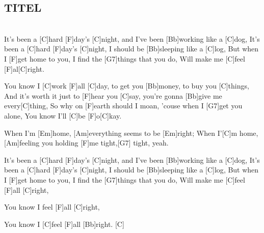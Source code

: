 \subsection{TITEL}

\begin{guitar}
\\
It's been a [C]{hard} [F]{day's} [C]{night}, and I've been [Bb]{work}ing like a [C]{dog},
It's been a [C]{hard} [F]{day's} [C]{night}, I should be [Bb]{sleep}ing like a [C]{log},
But when I [F]{get} home to you, I find the [G7]{things} that you do, 
Will make me [C]{feel} [F]{al}[C]{right}.


You know I [C]{work} [F]{all} [C]{day}, to get you [Bb]{mon}ey, to buy you [C]{things},
And it's worth it just to [F]{hear} you [C]{say}, you're gonna [Bb]{give} me every[C]{thing},
So why on [F]{earth} should I moan, 'couse when I [G7]{get} you alone, 
You know I'll [C]{be} [F]{o}[C]{kay}.


When I'm [Em]{home},  [Am]everything seems to be [Em]{right};
When I'[C]{m} home, [Am]feeling you holding [F]{me} tight,[G7]{ }tight, yeah.


It's been a [C]{hard} [F]{day's} [C]{night}, and I've been [Bb]{work}ing like a [C]{dog},
It's been a [C]{hard} [F]{day's} [C]{night}, I should be [Bb]{sleep}ing like a [C]{log},
But when I [F]{get} home to you, I find the [G7]{things} that you do,
Will make me [C]{feel} [F]{all} [C]{right},


You know I feel [F]{all} [C]{right},


You know I [C]{feel} [F]{all} [Bb]{right}.      [C]{}

\end{guitar}